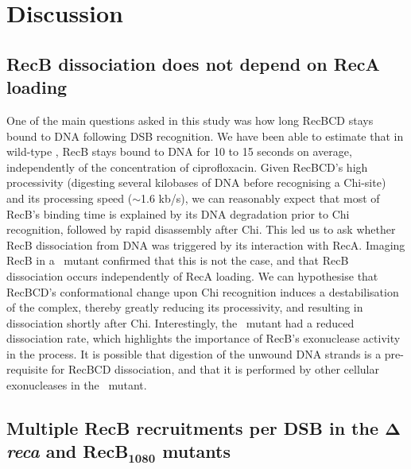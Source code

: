 \section*{Discussion}


\subsection*{RecB dissociation does not depend on RecA loading}
One of the main questions asked in this study was how long RecBCD stays bound to DNA following DSB recognition. We have been able to estimate that in wild-type \ecoli, RecB stays bound to DNA for 10 to 15 seconds on average, independently of the concentration of ciprofloxacin. Given RecBCD's high processivity (digesting several kilobases of DNA before recognising a Chi-site) and its processing speed ($\sim$1.6 kb/s\cite{Wiktor2018}), we can reasonably expect that most of RecB's binding time is explained by its DNA degradation prior to Chi recognition, followed by rapid disassembly after Chi. This led us to ask whether RecB dissociation from DNA was triggered by its interaction with RecA. Imaging RecB in a \dreca\ mutant confirmed that this is not the case, and that RecB dissociation occurs independently of RecA loading. We can hypothesise that RecBCD's conformational change upon Chi recognition induces a destabilisation of the complex, thereby greatly reducing its processivity, and resulting in dissociation shortly after Chi. Interestingly, the \geneteneighty\ mutant had a reduced dissociation rate, which highlights the importance of RecB's exonuclease activity in the process. It is possible that digestion of the unwound DNA strands is a pre-requisite for RecBCD dissociation, and that it is performed by other cellular exonucleases in the \geneteneighty\ mutant.

\subsection*{Multiple RecB recruitments per DSB in the $\mathbf{\Delta}$\emph{reca} and RecB$\mathbf{_{1080}}$ mutants}

